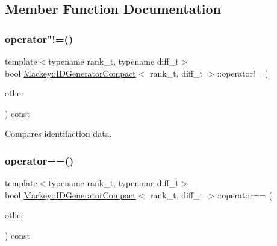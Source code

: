 \subsection{Member Function Documentation}
\mbox{\label{classMackey_1_1IDGeneratorCompact_a6c421e5744b9bc1b6215f2eea864fbdd}} 
\subsubsection{\texorpdfstring{operator"!=()}{operator!=()}}
{\footnotesize\ttfamily template$<$typename rank\+\_\+t, typename diff\+\_\+t$>$ \\
bool \hyperlink{classMackey_1_1IDGeneratorCompact}{Mackey\+::\+I\+D\+Generator\+Compact}$<$ rank\+\_\+t, diff\+\_\+t $>$\+::operator!= (\begin{DoxyParamCaption}\item[{const \hyperlink{classMackey_1_1IDGeneratorCompact}{I\+D\+Generator\+Compact}$<$ rank\+\_\+t, diff\+\_\+t $>$ \&}]{other }\end{DoxyParamCaption}) const\hspace{0.3cm}{\ttfamily [inline]}}



Compares identifaction data. 

\mbox{\label{classMackey_1_1IDGeneratorCompact_a44f930a793451c67a34101809930a2e6}} 
\subsubsection{\texorpdfstring{operator==()}{operator==()}}
{\footnotesize\ttfamily template$<$typename rank\+\_\+t, typename diff\+\_\+t$>$ \\
bool \hyperlink{classMackey_1_1IDGeneratorCompact}{Mackey\+::\+I\+D\+Generator\+Compact}$<$ rank\+\_\+t, diff\+\_\+t $>$\+::operator== (\begin{DoxyParamCaption}\item[{const \hyperlink{classMackey_1_1IDGeneratorCompact}{I\+D\+Generator\+Compact}$<$ rank\+\_\+t, diff\+\_\+t $>$ \&}]{other }\end{DoxyParamCaption}) const\hspace{0.3cm}{\ttfamily [inline]}}



